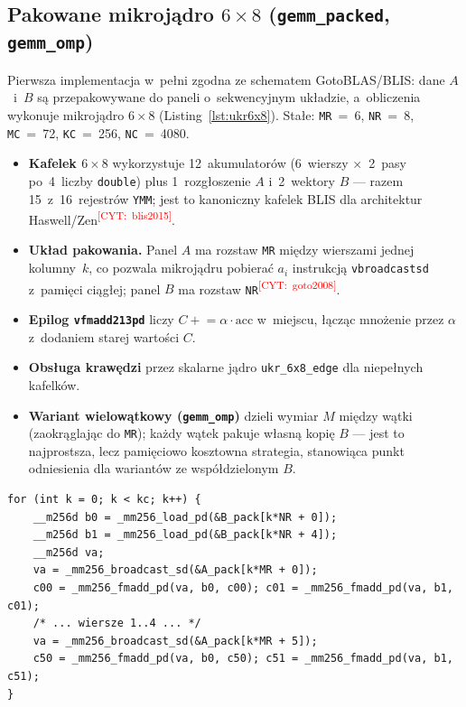 \documentclass[a4paper,12pt]{book} %
\newcommand{\todocite}[1]{\textsuperscript{\textcolor{red}{[CYT:~#1]}}}
\newcommand{\kod}[1]{\texttt{#1}}
\begin{document}
\subsection{Pakowane mikrojądro $6\times8$ (\kod{gemm\_packed}, \kod{gemm\_omp})}
Pierwsza implementacja w~pełni zgodna ze schematem GotoBLAS/BLIS: dane $A$~i~$B$
są przepakowywane do paneli o~sekwencyjnym układzie, a~obliczenia wykonuje
mikrojądro $6\times8$ (Listing~\ref{lst:ukr6x8}). Stałe:
\kod{MR}~=~6, \kod{NR}~=~8, \kod{MC}~=~72, \kod{KC}~=~256, \kod{NC}~=~4080.
\begin{itemize}
\item \textbf{Kafelek $6\times8$} wykorzystuje 12~akumulatorów (6~wierszy
  $\times$~2~pasy po~4~liczby \kod{double}) plus 1~rozgłoszenie $A$ i~2~wektory $B$
  --- razem 15~z~16~rejestrów \kod{YMM}; jest to kanoniczny kafelek BLIS dla
  architektur Haswell/Zen\todocite{blis2015}.
\item \textbf{Układ pakowania.} Panel $A$ ma rozstaw \kod{MR} między wierszami
  jednej kolumny~$k$, co pozwala mikrojądru pobierać $a_i$ instrukcją
  \kod{vbroadcastsd} z~pamięci ciągłej; panel $B$ ma rozstaw \kod{NR}\todocite{goto2008}.
\item \textbf{Epilog \kod{vfmadd213pd}} liczy $C \mathrel{+}= \alpha\cdot\mathrm{acc}$
  w~miejscu, łącząc mnożenie przez $\alpha$ z~dodaniem starej wartości $C$.
\item \textbf{Obsługa krawędzi} przez skalarne jądro \kod{ukr\_6x8\_edge} dla
  niepełnych kafelków.
\item \textbf{Wariant wielowątkowy (\kod{gemm\_omp})} dzieli wymiar $M$ między
  wątki (zaokrąglając do \kod{MR}); każdy wątek pakuje własną kopię $B$ ---
  jest to najprostsza, lecz pamięciowo kosztowna strategia, stanowiąca punkt
  odniesienia dla wariantów ze współdzielonym $B$.
\end{itemize}

\begin{lstfloat}[htbp]
\lstset{language=C}
\begin{lstlisting}[caption={Pętla $K$ mikrojądra $6\times8$ z~12~akumulatorami (\kod{gemm\_packed.c}).}, label={lst:ukr6x8}]
for (int k = 0; k < kc; k++) {
    __m256d b0 = _mm256_load_pd(&B_pack[k*NR + 0]);
    __m256d b1 = _mm256_load_pd(&B_pack[k*NR + 4]);
    __m256d va;
    va = _mm256_broadcast_sd(&A_pack[k*MR + 0]);
    c00 = _mm256_fmadd_pd(va, b0, c00); c01 = _mm256_fmadd_pd(va, b1, c01);
    /* ... wiersze 1..4 ... */
    va = _mm256_broadcast_sd(&A_pack[k*MR + 5]);
    c50 = _mm256_fmadd_pd(va, b0, c50); c51 = _mm256_fmadd_pd(va, b1, c51);
}
\end{lstlisting}
\end{lstfloat}
\end{document}
